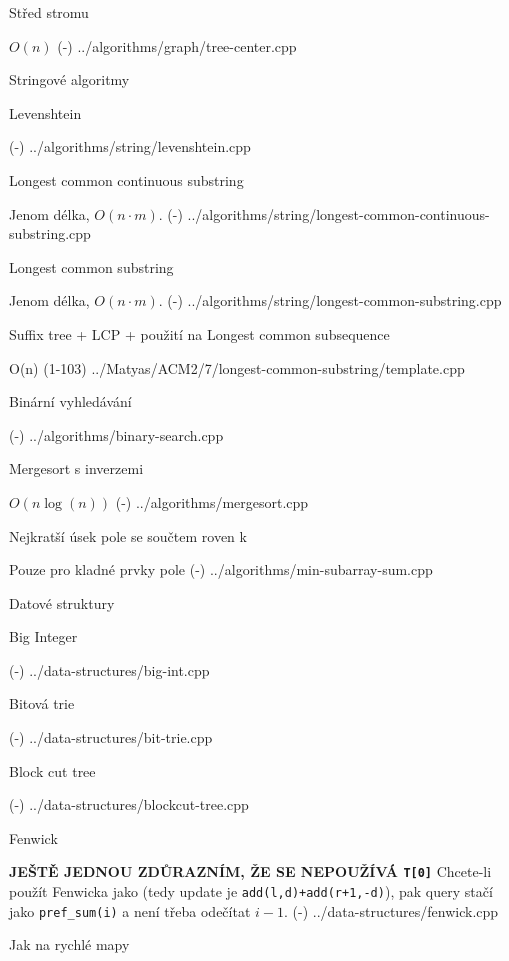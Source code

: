 \secc Střed stromu 

$O(n)$
\verbinput (-) ../algorithms/graph/tree-center.cpp

\sec Stringové algoritmy

\secc Levenshtein 

\verbinput (-) ../algorithms/string/levenshtein.cpp

\secc Longest common continuous substring 

Jenom délka, $O(n \cdot m)$.
\verbinput (-) ../algorithms/string/longest-common-continuous-substring.cpp

\secc Longest common substring 

Jenom délka, $O(n \cdot m)$.
\verbinput (-) ../algorithms/string/longest-common-substring.cpp

\secc Suffix tree + LCP + použití na Longest common subsequence 

O(n)
\verbinput (1-103) ../Matyas/ACM2/7/longest-common-substring/template.cpp

\sec Binární vyhledávání 

\verbinput (-) ../algorithms/binary-search.cpp

\sec Mergesort s inverzemi 

$O(n\log(n))$
\verbinput (-) ../algorithms/mergesort.cpp

\sec Nejkratší úsek pole se součtem roven k 

Pouze pro kladné prvky pole
\verbinput (-) ../algorithms/min-subarray-sum.cpp

\newpage

\chap Datové struktury

\sec Big Integer 

\verbinput (-) ../data-structures/big-int.cpp

\sec Bitová trie 

\verbinput (-) ../data-structures/bit-trie.cpp

\sec Block cut tree 

\verbinput (-) ../data-structures/blockcut-tree.cpp

\sec Fenwick

{\bf JEŠTĚ JEDNOU ZDŮRAZNÍM, ŽE SE NEPOUŽÍVÁ {\tt T[0]}}\linebreak
Chcete-li použít Fenwicka jako  (tedy update je {\tt add(l,d)+add(r+1,-d)}), pak query stačí jako {\tt pref\_sum(i)} a není třeba odečítat $i-1$.
\verbinput (-) ../data-structures/fenwick.cpp

\sec Jak na rychlé mapy 


